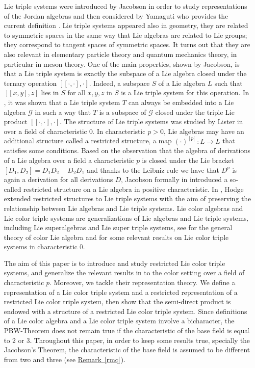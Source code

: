 \documentclass[11pt, twoside]{article}
\begin{document}
Lie triple systems were introduced by Jacobson in order to study representations of the Jordan algebras \cite{J51} and then considered by Yamaguti who provides the current definition \cite{Y58}. Lie triple systems appeared also in geometry, they are related to symmetric spaces in the same way that Lie algebras are related to Lie groups; they correspond to  tangent spaces of symmetric spaces. It turns out that they are also relevant in elementary particle theory and  quantum mechanics theory, in particular in meson theory.  One of the main properties, shown by Jacobson,  is that  a Lie triple system is exactly the subspace of a Lie algebra closed under the ternary operation $[[\cdot,\cdot],\cdot] $. Indeed, a subspace $S$ of a Lie algebra $L$ such that $[[x,y],z] $ lies in $S$ for all $x,y,z$ in $S$ is a Lie triple system for this operation. In \cite{J51}, it was shown  that a Lie triple system $T$ can always be embedded into a Lie algebra $\mathcal{G} $ in such a way that $T$ is a subspace of $\mathcal{G} $ closed under the triple Lie product  $[[\cdot,\cdot],\cdot] $. The structure of Lie triple systems was  studied by Lister in \cite{L51} over a field of characteristic 0. In characteristic $p>0$, Lie algebras may have an additional structure called a restricted structure, a map $(\cdot)^{[p]}: L\to L $ that satisfies some conditions. Based on the observation that the algebra of derivations of a Lie algebra over a field a characteristic $p$ is closed under the Lie bracket $[D_1,D_2]=D_1D_2 - D_2D_1 $ and  thanks to the Leibniz rule we have that  $D^p$ is again a derivation for all derivations $D$,  Jacobson formally in \cite{J41} introduced a so-called restricted structure on a Lie algebra in positive characteristic. In \cite{H01}, Hodge extended  restricted structures to Lie triple systems with the aim of preserving the relationship between Lie algebras and Lie triple systems. Lie color algebras and Lie color triple systems are generalizations of Lie algebras and Lie triple systems, including Lie superalgebras and Lie super triple systems, see \cite{BMPZ92,S79}  for the general theory of color Lie algebra  and \cite{AAM13,CZC19,KZ23,LM22} for some relevant results on Lie color triple systems in characteristic 0. 

The aim of this paper is to introduce and study  restricted Lie color triple systems,  and generalize the relevant  results in \cite{H01} to the color setting over a field of characteristic $p$. Moreover, we tackle their representation theory. We define a representation of a Lie color triple system and a restricted representation of a restricted Lie color triple system, then show that the semi-direct product is endowed with a structure of a restricted Lie color triple system. Since  definitions of a Lie color algebra and a Lie color triple system  involve a bicharacter, the PBW-Theorem does not remain true if the characteristic of the base field is equal to $2$ or $3$. Throughout this paper, in order to keep some results true, specially the Jacobson's Theorem, the characteristic of the base field is assumed to be different from two and three (see \hyperref[rmq]{Remark~\ref*{rmq}}). 
\end{document}
